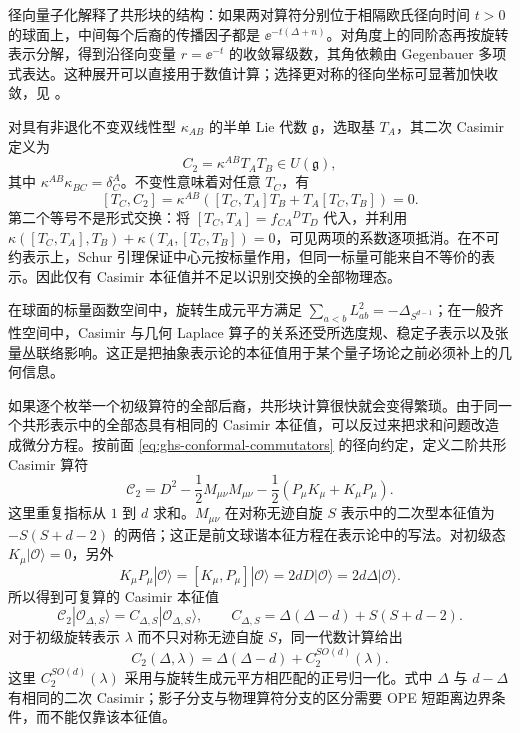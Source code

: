 径向量子化解释了共形块的结构：如果两对算符分别位于相隔欧氏径向时间 $t>0$ 的球面上，中间每个后裔的传播因子都是 $\ee^{-t(\Delta+n)}$。对角度上的同阶态再按旋转表示分解，得到沿径向变量 $r=\ee^{-t}$ 的收敛幂级数，其角依赖由 Gegenbauer 多项式表达。这种展开可以直接用于数值计算；选择更对称的径向坐标可显著加快收敛，见 \cite{ghs-hogervorst}。


对具有非退化不变双线性型 $\kappa_{AB}$ 的半单 Lie 代数 $\mathfrak g$，选取基 $T_A$，其二次 Casimir 定义为
\begin{equation}\label{eq:ghs-abstract-quadratic-casimir}
 C_2=\kappa^{AB}T_AT_B\in U(\mathfrak g),
\end{equation}
其中 $\kappa^{AB}\kappa_{BC}=\delta^A_C$。不变性意味着对任意 $T_C$，有
\[
 [T_C,C_2]=\kappa^{AB}([T_C,T_A]T_B+T_A[T_C,T_B])=0.
\]
第二个等号不是形式交换：将 $[T_C,T_A]=f_{CA}{}^DT_D$ 代入，并利用
$\kappa([T_C,T_A],T_B)+\kappa(T_A,[T_C,T_B])=0$，可见两项的系数逐项抵消。在不可约表示上，Schur 引理保证中心元按标量作用，但同一标量可能来自不等价的表示。因此仅有 Casimir 本征值并不足以识别交换的全部物理态。

在球面的标量函数空间中，旋转生成元平方满足 $\sum_{a<b}L_{ab}^2=-\Delta_{S^{d-1}}$；在一般齐性空间中，Casimir 与几何 Laplace 算子的关系还受所选度规、稳定子表示以及张量丛联络影响。这正是把抽象表示论的本征值用于某个量子场论之前必须补上的几何信息。


如果逐个枚举一个初级算符的全部后裔，共形块计算很快就会变得繁琐。由于同一个共形表示中的全部态具有相同的 Casimir 本征值，可以反过来把求和问题改造成微分方程。按前面 \cref{eq:ghs-conformal-commutators} 的径向约定，定义二阶共形 Casimir 算符
\begin{equation}\label{eq:ghs-conformal-quadratic-casimir}
 \mathcal C_2
 =D^2-\frac12M_{\mu\nu}M_{\mu\nu}
 -\frac12\left(P_\mu K_\mu+K_\mu P_\mu\right).
\end{equation}
这里重复指标从 $1$ 到 $d$ 求和。$M_{\mu\nu}$ 在对称无迹自旋 $S$ 表示中的二次型本征值为 $-S(S+d-2)$ 的两倍；这正是前文球谐本征方程在表示论中的写法。对初级态 $K_\mu|\mathcal O\rangle=0$，另外
\begin{equation*}
 K_\mu P_\mu|\mathcal O\rangle
 =[K_\mu,P_\mu]|\mathcal O\rangle
 =2dD|\mathcal O\rangle=2d\Delta|\mathcal O\rangle.
\end{equation*}
所以得到可复算的 Casimir 本征值
\begin{equation}\label{eq:ghs-casimir-eigenvalue}
 \mathcal C_2|\mathcal O_{\Delta,S}\rangle
 =C_{\Delta,S}|\mathcal O_{\Delta,S}\rangle,
 \qquad C_{\Delta,S}=\Delta(\Delta-d)+S(S+d-2).
\end{equation}
对于初级旋转表示 $\lambda$ 而不只对称无迹自旋 $S$，同一代数计算给出
\begin{equation}\label{eq:ghs-general-conformal-casimir-eigen}
 C_2(\Delta,\lambda)=\Delta(\Delta-d)+C_2^{SO(d)}(\lambda).
\end{equation}
这里 $C_2^{SO(d)}(\lambda)$ 采用与旋转生成元平方相匹配的正号归一化。式中 $\Delta$ 与 $d-\Delta$ 有相同的二次 Casimir；影子分支与物理算符分支的区分需要 OPE 短距离边界条件，而不能仅靠该本征值。

